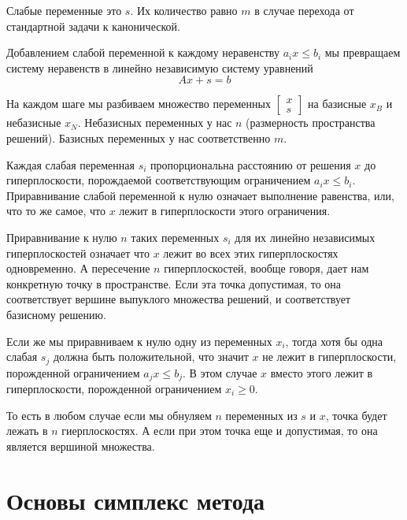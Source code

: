 \documentclass[a4paper,article,14pt]{extarticle}
\begin{document}
Слабые переменные это \(s\).
Их количество равно \(m\) в случае перехода от стандартной задачи к канонической.

Добавлением слабой переменной к каждому неравенству \(a_ix \le b_i\) мы превращаем систему неравенств в линейно независимую систему уравнений
\begin{equation}
    Ax + s = b
\end{equation}

На каждом шаге мы разбиваем множество переменных
\(\begin{bmatrix}
    x \\ s
\end{bmatrix}\)
на базисные \(x_B\) и небазисные \(x_N\).
Небазисных переменных у нас \(n\) (размерность пространства решений).
Базисных переменных у нас соответственно \(m\).

Каждая слабая переменная \(s_i\) пропорциональна расстоянию от решения \(x\) до гиперплоскости, порождаемой соответствующим ограничением \(a_ix \le b_i\).
Приравнивание слабой переменной к нулю означает выполнение равенства, или, что то же самое, что \(x\) лежит в гиперплоскости этого ограничения.

Приравнивание к нулю \(n\) таких переменных \(s_i\) для их линейно независимых гиперплоскостей означает что \(x\) лежит во всех этих гиперплоскостях одновременно.
А пересечение \(n\) гиперплоскостей, вообще говоря, дает нам конкретную точку в пространстве.
Если эта точка допустимая, то она соответствует вершине выпуклого множества решений, и соответствует базисному решению.

Если же мы приравниваем к нулю одну из переменных \(x_i\), тогда хотя бы одна слабая \(s_j\) должна быть положительной, что значит \(x\) не лежит в гиперплоскости, порожденной ограничением \(a_jx \le b_j\).
В этом случае \(x\) вместо этого лежит в гиперплоскости, порожденной ограничением \(x_i \ge 0\).

То есть в любом случае если мы обнуляем \(n\) переменных из \(s\) и \(x\), точка будет лежать в \(n\) гиерплоскостях. А если при этом точка еще и допустимая, то она является вершиной множества.

\newpage


\section{Основы симплекс метода}
\end{document}
